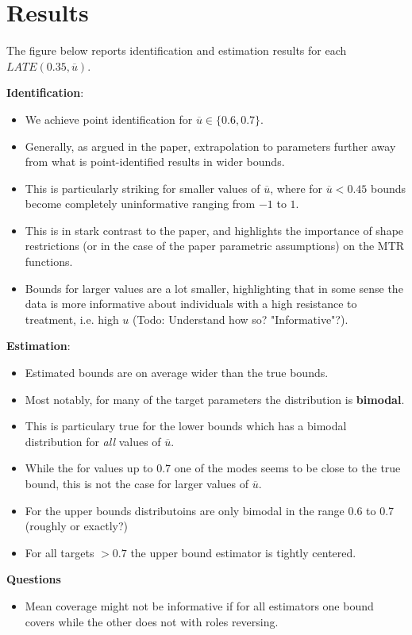 \documentclass{article}
\begin{document}
\section{Results}
The figure below reports identification and estimation results for each $LATE(0.35, \overline{u})$.

\textbf{Identification}:
\begin{itemize}
    \item We achieve point identification for $\overline{u} \in \{0.6,0.7\}$.
    \item Generally, as argued in the paper, extrapolation to parameters further away from what is point-identified results in wider bounds.
    \item This is particularly striking for smaller values of $\overline{u}$, where for $\overline{u}<0.45$ bounds become completely uninformative ranging from $-1$ to $1$.
    \item This is in stark contrast to the paper, and highlights the importance of shape restrictions (or in the case of the paper parametric assumptions) on the MTR functions.
    \item Bounds for larger values are a lot smaller, highlighting that in some sense the data is more informative about individuals with a high resistance to treatment, i.e. high $u$ (Todo: Understand how so? "Informative"?).
\end{itemize}

\textbf{Estimation}:
\begin{itemize}
    \item Estimated bounds are on average wider than the true bounds.
    \item Most notably, for many of the target parameters the distribution is \textbf{bimodal}.
    \item This is particulary true for the lower bounds which has a bimodal distribution for \textit{all} values of $\overline{u}$.
    \item While the for values up to $0.7$ one of the modes seems to be close to the true bound, this is not the case for larger values of $\overline{u}$.
    \item For the upper bounds distributoins are only bimodal in the range 0.6 to 0.7 (roughly or exactly?)
    \item For all targets $>0.7$ the upper bound estimator is tightly centered.
\end{itemize}

\textbf{Questions}
\begin{itemize}
    \item Mean coverage might not be informative if for all estimators one bound covers while the other does not with roles reversing.
\end{itemize}
\end{document}
